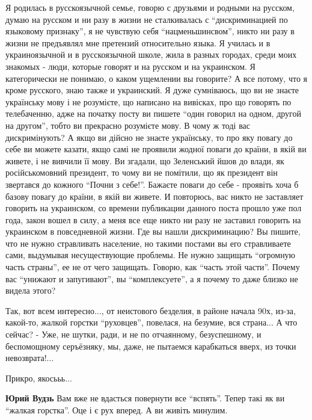 \begin{itemize}
{Я родилась в русскоязычной семье, говорю с друзьями и родными на русском, думаю
на русском и ни разу в жизни не сталкивалась с \enquote{дискриминацией по языковому
признаку}, я не чувствую себя \enquote{нацменьшинсвом}, никто ни разу в жизни не
предъявлял мне претензий относительно языка. Я училась и в украиноязычной и в
русскоязычной школе, жила в разных городах, среди моих знакомых - люди, которые
говорят и на русском и на украинском. Я категорически не понимаю, о каком
ущемлении вы говорите? А все потому, что я кроме русского, знаю также и
украинский. Я дуже сумніваюсь, що ви не знаєте українську мову і не розумієте,
що написано на вивісках, про що говорять по телебаченню, адже на початку посту
ви пишете \enquote{один говорил на одном, другой на другом}, тобто ви прекрасно
розумієте мову. В чому ж тоді вас дискримінують? А якщо ви дійсно не знаєте
українську, то про яку повагу до себе ви можете казати, якщо самі не проявили
жодної поваги до країни, в якій ви живете, і не вивчили її мову. Ви згадали, що
Зеленський йшов до влади, як російськомовний президент, то чому ви не помітили,
що як президент він звертався до кожного \enquote{Почни з себе!}. Бажаєте поваги до
себе - проявіть хоча б базову повагу до країни, в якій ви живете. И повторюсь,
вас никто не заставляет говорить на украинском, со времени публикации данного
поста прошло уже пол года, закон вошел в силу, а меня все еще никто ни разу не
заставил говорить на украинском в повседневной жизни. Где вы нашли
дискриминацию? Вы пишите, что не нужно стравливать население, но такими постами
вы его стравливаете сами, выдумывая несуществующие проблемы. Не нужно защищать
\enquote{огромную часть страны}, ее не от чего защищать. Говорю, как \enquote{часть этой
части}. Почему вас \enquote{унижают и запугивают}, вы \enquote{комплексуете}, а я почему то
даже близко не видела этого?


Так, вот всем интересно..., от неистового безделия, в районе начала 90х, из-за,
какой-то, жалкой горстки \enquote{руховцев}, повелася, на безумие, вся страна...
А что сейчас?
- Уже, не шутки, ради, и не по отчаянному, безуспешному, и беспомощному серъёзняку, мы, даже, не пытаемся карабкаться вверх, из точки невозврата!...

\begin{itemize}
Прикро, якосььь...

\textbf{Юрий Вудзь} Вам вже не вдасться повернути все \enquote{вспять}. Тепер
такі як ви \enquote{жалкая горстка}. Оце і є рух вперед. А ви живіть минулим.


\end{itemize}}
\end{itemize}
